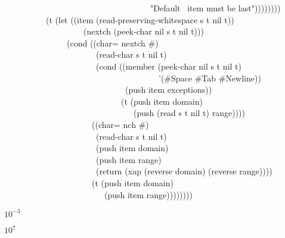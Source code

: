 {\begin{table}
\begin{new}
\begin{lisp}
~~~~~~~~~~~~~~~~~~~~~~~~~~~~~~~~~~~"Default~{\Xarrowright} item must be last")))))))) \\ 
~~~~~~~~~~(t (let ((item (read-preserving-whitespace s t nil t)) \\ 
~~~~~~~~~~~~~~~~~~~(nextch (peek-char nil s t nil t))) \\ 
~~~~~~~~~~~~~~~(cond ((char= nextch \#{\Xbackslash}{\Xarrowright}) \\ 
~~~~~~~~~~~~~~~~~~~~~~(read-char s t nil t) \\ 
~~~~~~~~~~~~~~~~~~~~~~(cond ((member (peek-char nil s t nil t) \\ 
~~~~~~~~~~~~~~~~~~~~~~~~~~~~~~~~~~~~~'(\#{\Xbackslash}Space \#{\Xbackslash}Tab \#{\Xbackslash}Newline)) \\ 
~~~~~~~~~~~~~~~~~~~~~~~~~~~~~(push item exceptions)) \\ 
~~~~~~~~~~~~~~~~~~~~~~~~~~~~(t (push item domain) \\ 
~~~~~~~~~~~~~~~~~~~~~~~~~~~~~~~(push (read s t nil t) range)))) \\ 
~~~~~~~~~~~~~~~~~~~~~((char= nch \#{\Xbackslash}{\Xrbrace}) \\ 
~~~~~~~~~~~~~~~~~~~~~~(read-char s t nil t) \\ 
~~~~~~~~~~~~~~~~~~~~~~(push item domain) \\ 
~~~~~~~~~~~~~~~~~~~~~~(push item range) \\ 
~~~~~~~~~~~~~~~~~~~~~~(return (xap (reverse domain) (reverse range)))) \\ 
~~~~~~~~~~~~~~~~~~~~~(t (push item domain) \\ 
~~~~~~~~~~~~~~~~~~~~~~~~(push item range))))))))
\end{lisp}
\end{new}
\end{table}
}

{\newpage
\clearpage
\samepage $10^{-3}$
}

{\newpage
\clearpage
\samepage $10^7$
}

